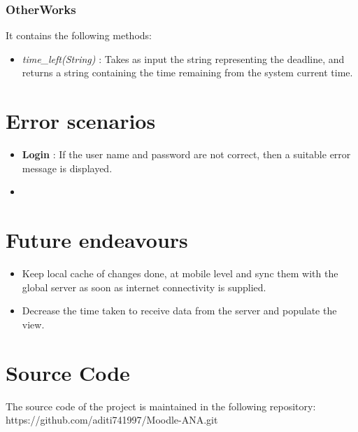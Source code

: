 \documentclass{article}
\begin{document}
\subsubsection{OtherWorks}
\par\noindent It contains the following methods:
\begin{itemize}
\item \textit{time\_left(String)} : Takes as input the string representing the deadline, and returns a string containing the time remaining from the system current time.
\end{itemize}

\section{Error scenarios}
\begin{itemize}
\item \textbf{Login} : If the user name and password are not correct, then a suitable error message is displayed.

\item \textbf{}
\end{itemize}


\section{Future endeavours}
\begin{itemize}
\item Keep local cache of changes done, at mobile level and sync them with the global server as soon as internet connectivity is supplied.
\item Decrease the time taken to receive data from the server and populate the view.
\end{itemize}


\section{Source Code}
\par\noindent The source code of the project is maintained in the following repository:\\
https://github.com/aditi741997/Moodle-ANA.git


\medskip

\end{document}
